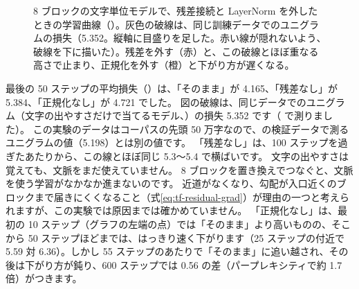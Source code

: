 \begin{figure}[tbp]
\centering
{}
\caption{8 ブロックの文字単位モデルで、残差接続と LayerNorm を外したときの学習曲線（）。灰色の破線は、同じ訓練データでのユニグラムの損失（5.352。縦軸に目盛りを足した。赤い線が隠れないよう、破線を下に描いた）。残差を外す（赤）と、この破線とほぼ重なる高さで止まり、正規化を外す（橙）と下がり方が遅くなる。}
\label{fig:tf-ablation}
\end{figure}

最後の 50 ステップの平均損失（）は、「そのまま」が 4.165、「残差なし」が 5.384、「正規化なし」が 4.721 でした。
図の破線は、同じデータでのユニグラム（文字の出やすさだけで当てるモデル、）の損失 5.352 です（ で測りました）。
この実験のデータはコーパスの先頭 50 万字なので、の検証データで測るユニグラムの値（5.198）とは別の値です。
「残差なし」は、100 ステップを過ぎたあたりから、この線とほぼ同じ 5.3〜5.4 で横ばいです。
文字の出やすさは覚えても、文脈をまだ使えていません。
8 ブロックを置き換えでつなぐと、文脈を使う学習がなかなか進まないのです。
近道がなくなり、勾配が入口近くのブロックまで届きにくくなること（式\eqref{eq:tf-residual-grad}）が理由の一つと考えられますが、この実験では原因までは確かめていません。
「正規化なし」は、最初の 10 ステップ（グラフの左端の点）では「そのまま」より高いものの、そこから 50 ステップほどまでは、はっきり速く下がります（25 ステップの付近で 5.59 対 6.36）。しかし 55 ステップのあたりで「そのまま」に追い越され、その後は下がり方が鈍り、600 ステップでは 0.56 の差（パープレキシティで約 1.7 倍）がつきます。

